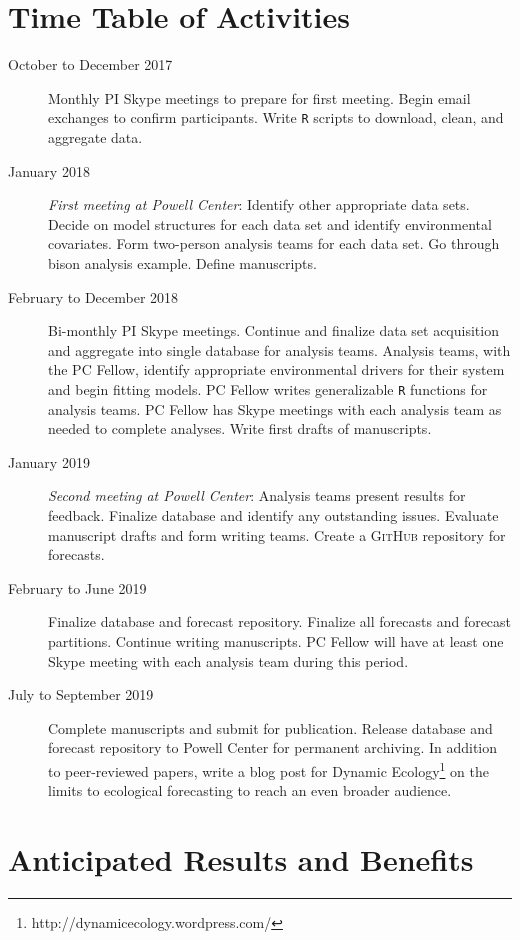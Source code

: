 \documentclass[12pt,]{article}
\let\rmarkdownfootnote\footnote%
\def\footnote{\protect\rmarkdownfootnote}
\begin{document}
\section{Time Table of Activities}\begin{description}

\item[October to December 2017] Monthly PI Skype meetings to prepare for first meeting. Begin email exchanges to confirm participants. Write \texttt{R} scripts to download, clean, and aggregate data.
\item[January 2018] \textit{First meeting at Powell Center}: Identify other appropriate data sets. Decide on model structures for each data set and identify environmental covariates. Form two-person analysis teams for each data set. Go through bison analysis example. Define manuscripts.
\item[February to December 2018] Bi-monthly PI Skype meetings. Continue and finalize data set acquisition and aggregate into single database for analysis teams. Analysis teams, with the PC Fellow, identify appropriate environmental drivers for their system and begin fitting models. PC Fellow writes generalizable \texttt{R} functions for analysis teams. PC Fellow has Skype meetings with each analysis team as needed to complete analyses. Write first drafts of manuscripts.
\item[January 2019] \textit{Second meeting at Powell Center}: Analysis teams present results for feedback. Finalize database and identify any outstanding issues. Evaluate manuscript drafts and form writing teams. Create a \textsc{GitHub} repository for forecasts.
\item[February to June 2019] Finalize database and forecast repository. Finalize all forecasts and forecast partitions. Continue writing manuscripts. PC Fellow will have at least one Skype meeting with each analysis team during this period.
\item[July to September 2019] Complete manuscripts and submit for publication. Release database and forecast repository to Powell Center for permanent archiving. In addition to peer-reviewed papers, write a blog post for Dynamic Ecology\footnote{http://dynamicecology.wordpress.com/} on the limits to ecological forecasting to reach an even broader audience.

\end{description}

\section{Anticipated Results and Benefits}
\end{document}
